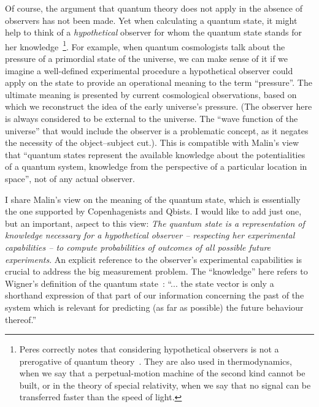 \documentclass[12pt]{article}
\begin{document}
Of course, the argument that quantum theory does not apply in the absence of observers has not been made. Yet when calculating a quantum state, it might help to think of a {\it hypothetical} observer for whom the quantum state stands for her knowledge~\footnote{Peres correctly notes that considering hypothetical observers is not a prerogative of quantum theory~\cite{peres}. They are also used in thermodynamics, when we say that a perpetual-motion machine of the second kind cannot be built, or in the theory of special relativity, when we say that no signal can be transferred faster than the speed of light.}. For example, when quantum cosmologists talk about the pressure of a primordial state of the universe, we can make sense of it if we imagine a well-defined experimental procedure a  hypothetical observer could apply on the state to provide an operational meaning to the term ``pressure''. The ultimate meaning is presented by current cosmological observations, based on which we reconstruct the idea of the early universe's pressure. (The observer here is always considered to be external to the universe. The ``wave function of the universe'' that would include the observer is a problematic concept, as it negates the necessity of the object--subject cut.). This is compatible with Malin's view~\cite{malin} that ``quantum states represent the available knowledge about the potentialities of a quantum system, knowledge from the perspective of a particular location in space'', not of any actual observer. 

I share Malin's view on the meaning of the quantum state, which is essentially the one supported by Copenhagenists and Qbists. I would like to add just one, but an important, aspect to this view: 
{\em The quantum state is a representation of knowledge necessary for a hypothetical  observer -- respecting her experimental capabilities -- to compute probabilities of outcomes of all possible future experiments}. An explicit reference to the observer's experimental capabilities is crucial to address the big measurement problem. The ``knowledge'' here refers to Wigner's definition of the quantum state~\cite{wigner}: ``... the state vector is only a shorthand expression of that part of our information concerning the past of the system which is relevant for predicting (as far as possible) the future behaviour thereof.''
\end{document}
